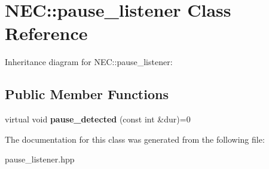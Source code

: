 \hypertarget{classNEC_1_1pause__listener}{}\section{N\+EC\+:\+:pause\+\_\+listener Class Reference}
\label{classNEC_1_1pause__listener}


Inheritance diagram for N\+EC\+:\+:pause\+\_\+listener\+:
\subsection*{Public Member Functions}
\begin{DoxyCompactItemize}
\item 
\mbox{\label{classNEC_1_1pause__listener_ad09a39b4bf623f43b216af071d2fc2f5}} 
virtual void {\bfseries pause\+\_\+detected} (const int \&dur)=0
\end{DoxyCompactItemize}


The documentation for this class was generated from the following file\+:\begin{DoxyCompactItemize}
\item 
pause\+\_\+listener.\+hpp\end{DoxyCompactItemize}
